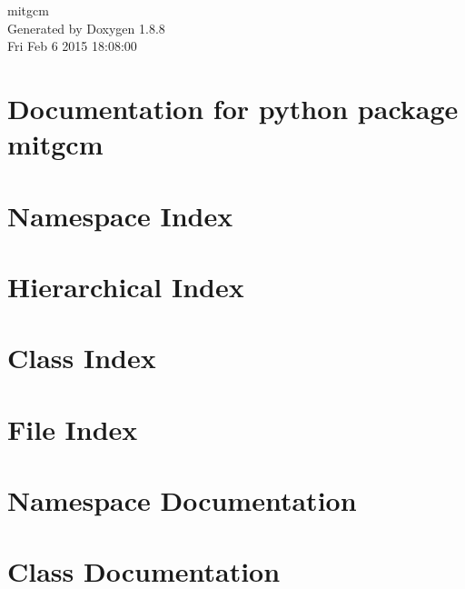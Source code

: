 \documentclass[twoside]{book}
\newcommand{\+}{\discretionary{\mbox{\scriptsize$\hookleftarrow$}}{}{}}
\newcommand{\clearemptydoublepage}{%
  \newpage{\pagestyle{empty}\cleardoublepage}%
}
\begin{document}
\hypersetup{pageanchor=false,
             bookmarks=true,
             bookmarksnumbered=true,
             pdfencoding=unicode
            }
\begin{titlepage}
\vspace*{7cm}
\begin{center}%
{\Large mitgcm }\\
\vspace*{1cm}
{\large Generated by Doxygen 1.8.8}\\
\vspace*{0.5cm}
{\small Fri Feb 6 2015 18:08:00}\\
\end{center}
\end{titlepage}
\clearemptydoublepage
\tableofcontents
\clearemptydoublepage
{}
\hypersetup{pageanchor=true}

\chapter{Documentation for python package mitgcm}
\label{index}\hypertarget{index}{}
\chapter{Namespace Index}

\chapter{Hierarchical Index}

\chapter{Class Index}

\chapter{File Index}

\chapter{Namespace Documentation}





\chapter{Class Documentation}














\end{document}
